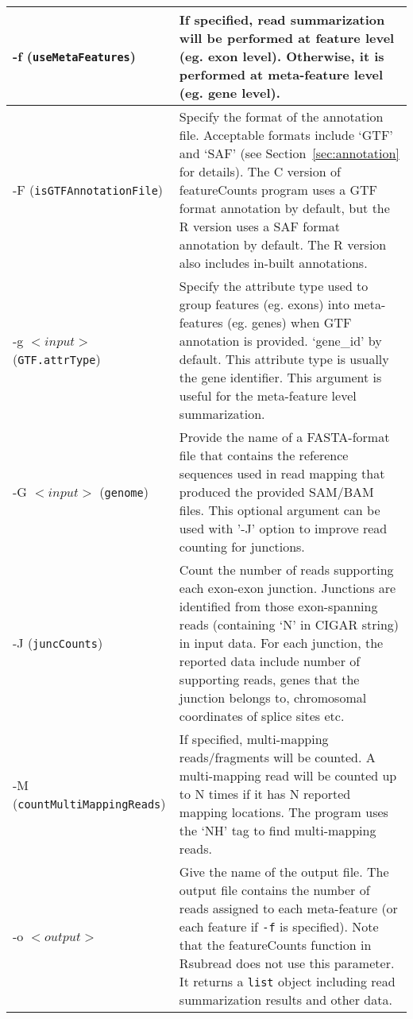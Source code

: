 \documentclass[12pt]{report}
\newcommand{\code}[1]{{\small\texttt{#1}}}
\newcommand{\Rsubread}{\textsf{Rsubread}}
\newcommand{\featureCounts}{\textsf{featureCounts}}
\newcommand{\C}{\textsf{C}}
\begin{document}
\begin{longtable}{|p{5cm}|p{11cm}|}
\hline
-f \newline (\code{useMetaFeatures}) & If specified, read summarization will be performed at feature level (eg. exon level). Otherwise, it is performed at meta-feature level (eg. gene level).\\
\hline
-F \newline (\code{isGTFAnnotationFile}) & Specify the format of the annotation file. Acceptable formats include `GTF' and `SAF' (see Section~\ref{sec:annotation} for details). The {\C} version of {\featureCounts} program uses a GTF format annotation by default, but the R version uses a SAF format annotation by default. The R version also includes in-built annotations.\\
\hline
-g $<input>$ \newline (\code{GTF.attrType}) & Specify the attribute type used to group features (eg. exons) into meta-features (eg. genes) when GTF annotation is provided. `gene\_id' by default. This attribute type is usually the gene identifier. This argument is useful for the meta-feature level summarization.\\
\hline
-G $<input>$ \newline (\code{genome}) & Provide the name of a FASTA-format file that contains the reference sequences used in
read mapping that produced the provided SAM/BAM files. This optional argument can be used with '-J' option to improve read counting for junctions.\\
\hline
-J \newline (\code{juncCounts}) & Count the number of reads supporting each exon-exon junction. Junctions are identified from those exon-spanning reads (containing `N' in CIGAR string) in input data. For each junction, the reported data include number of supporting reads, genes that the junction belongs to, chromosomal coordinates of splice sites etc.\\
\hline
-M \newline (\code{countMultiMappingReads}) & If specified, multi-mapping reads/fragments will be counted. A multi-mapping read will be counted up to N times if it has N reported mapping locations. The program uses the `NH' tag to find multi-mapping reads.\\
\hline
-o $<output>$ & Give the name of the output file. The output file contains the number of reads assigned to each meta-feature (or each feature if \code{-f} is specified). Note that the {\featureCounts} function in {\Rsubread} does not use this parameter. It returns a \code{list} object including read summarization results and other data. \\

\end{longtable}
\end{document}
